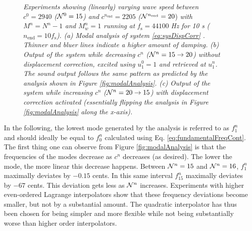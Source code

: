 \begin{figure}[ht!]
    \vspace{-1em}\caption{{\it Experiments showing (linearly) varying wave speed between $c^0 = 2940$ ($\mathcal{N}^0 = 15$) and} $c^{n_\text{end}} = 2205$ {\it (}$\mathcal{N}^{n_\text{end}} = 20$) {\it with $M^n = N^n - 1$ and $M_w^n = 1$ running at }$f_\text{s} = 44100$ {\it Hz for 10 s (}$n_\text{end} = 10f_\text{s}${\it ). (a) Modal analysis of system \eqref{eq:sysDispCorr}%
    . Thinner and bluer lines indicate a higher amount of damping. (b) Output of the system while decreasing $c^n$ ($\mathcal{N}^n = 15 \rightarrow 20$) without displacement correction, excited using $u_1^0=1$ and retrieved at $u_1^n$. The sound output follows the same pattern as predicted by the analysis shown in Figure \ref{fig:modalAnalysis}. (c) Output of the system while increasing $c^n$ ($\mathcal{N}^n = 20 \rightarrow 15$) with displacement correction activated (essentially flipping the analysis in Figure \ref{fig:modalAnalysis} along the x-axis).}\label{fig:analysisAndSpecs}}
\end{figure}
In the following, %
the lowest mode generated by the analysis is referred to as $f_1^n$ and should ideally be equal to $f_0^n$ calculated using Eq. \eqref{eq:fundamentalFreqCont}. %
%
The first thing one can observe from Figure \ref{fig:modalAnalysis} is that the frequencies of the modes decrease as $c^n$ decreases (as desired). The lower the mode, the more linear this decrease happens. Between $\mathcal{N}^n = 15$ and $\mathcal{N}^n = 16$, $f_1^n$ maximally deviates by $-0.15$ cents. In this same interval $f_{15}^n$ maximally deviates by $-67$ cents. This deviation %
gets %
less as $\mathcal{N}^n$ increases. %
%
Experiments with higher even-ordered Lagrange interpolators show that these frequency deviations become smaller, but not by a substantial amount. The quadratic interpolator has thus been chosen for being simpler and more flexible while not being substantially worse than higher order interpolators.


